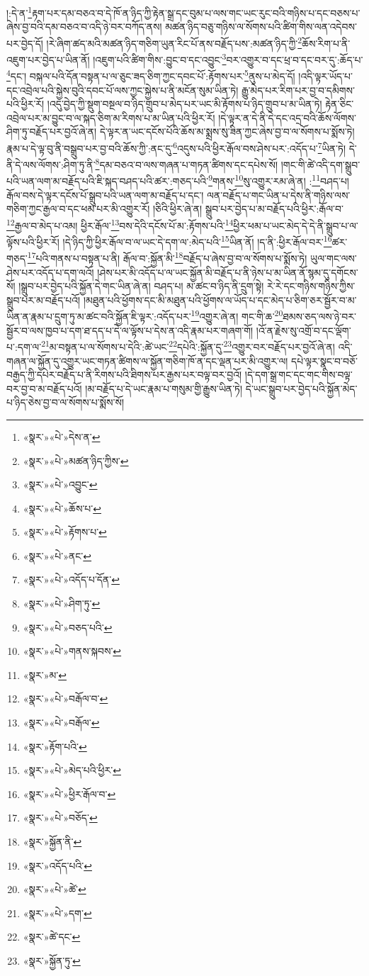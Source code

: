 །:དེ་ན་\footnote{«སྣར་»«པེ་»དེས་ན་}རྟག་པར་དམ་བཅའ་བ་དེ་ཁོ་ན་ཉིད་ཀྱི་རྟེན་སྒྲ་དང་བུམ་པ་ལས་གང་ཡང་རུང་བའི་གཉིས་པ་དང་བཅས་པ་ཞེས་བྱ་བའི་དམ་བཅའ་བ་འདི་ཉེ་བར་བཀོད་ནས། མཚན་ཉིད་བཅུ་གཉིས་ལ་སོགས་པའི་ཚིག་གིས་ལན་འདེབས་པར་བྱེད་དོ། །རེ་ཞིག་ཚད་མའི་མཚན་ཉིད་གཅིག་ཡུན་རིང་པོ་ནས་བརྗོད་པས་:མཚན་ཉིད་ཀྱི་\footnote{«སྣར་»«པེ་»མཚན་ཉིད་ཀྱིས་}ཆོས་རིག་པ་ནི་འཇུག་པར་བྱེད་པ་ཡིན་ནོ། །འཇུག་པའི་ཚིག་གིས་:བྱུང་བ་དང་འབྱུང་\footnote{«སྣར་»«པེ་»འབྱུང་}བར་འགྱུར་བ་དང་ཕྲ་བ་དང་བར་དུ་:ཆོད་པ་\footnote{«སྣར་»«པེ་»ཆོས་པ་}དང་། བསྐལ་པའི་དོན་བསྟན་པ་ལ་ཅུང་ཟད་ཅིག་ཀྱང་དབང་པོ་:རྟོགས་པར་\footnote{«སྣར་»«པེ་»རྟོགས་པ་}ནུས་པ་མེད་དོ། །འདི་ལྟར་ཡོད་པ་དང་འབྲེལ་པའི་སྐྱེས་བུའི་དབང་པོ་ལས་ཀྱང་སྐྱེས་པ་ནི་མངོན་སུམ་ཡིན་ཏེ། རྒྱུ་མེད་པར་རིག་པར་བྱ་བ་དམིགས་པའི་ཕྱིར་རོ། །འདུ་བྱེད་ཀྱི་སྡུག་བསྔལ་བ་ཉིད་གྲུབ་པ་མེད་པར་ཡང་མི་རྟོགས་པ་ཉིད་གྲུབ་པ་མ་ཡིན་ཏེ། རྟེན་ཅིང་འབྲེལ་པར་མ་བྱུང་བ་ལ་སྐད་ཅིག་མ་རིགས་པ་མ་ཡིན་པའི་ཕྱིར་རོ། །དེ་ལྟར་ན་དེ་ནི་དེ་དང་འདྲ་བའི་ཆོས་ལོགས་ཤིག་ཏུ་བརྗོད་པར་བྱའོ་ཞེ་ན། དེ་ལྟར་ན་ཡང་དངོས་པོའི་ཆོས་མ་སྨྲས་སུ་ཟིན་ཀྱང་ཞེས་བྱ་བ་ལ་སོགས་པ་སྨོས་ཏེ། རྣམ་པ་དེ་ལྟ་བུ་ནི་བསྒྲུབ་པར་བྱ་བའི་ཆོས་ཀྱི་:ནང་དུ་\footnote{«སྣར་»«པེ་»ནང་}འདུས་པའི་ཕྱིར་རྒོལ་བས་ཤེས་པར་:འདོད་པ་\footnote{«སྣར་»«པེ་»འདོད་པ་དོན་}ཡིན་ཏེ། དེ་ནི་དེ་ལས་ལོགས་:ཤིག་ཏུ་ནི་\footnote{«སྣར་»«པེ་»ཤིག་ཏུ་}དམ་བཅའ་བ་ལས་གཞན་པ་གཏན་ཚིགས་དང་དཔེས་སོ། །གང་གི་ཚེ་འདི་དག་སྒྲུབ་པའི་ཡན་ལག་མ་བརྗོད་པའི་ཇི་སྐད་བཤད་པའི་ཚར་:གཅད་པའི་\footnote{«སྣར་»«པེ་»བཅད་པའི་}གནས་\footnote{«སྣར་»«པེ་»གནས་སྐབས་}སུ་འགྱུར་རམ་ཞེ་ན། :\footnote{«སྣར་»མ་}བཤད་པ། རྒོལ་བས་དེ་ལྟར་དངོས་པོ་སྒྲུབ་པའི་ཡན་ལག་མ་བརྗོད་པ་དང་། ལན་བརྗོད་པ་གང་ཡིན་པ་དེས་ནི་གཉིས་ལས་གཅིག་ཀྱང་རྒྱལ་བ་དང་ཕམ་པར་མི་འགྱུར་རོ། །ཅིའི་ཕྱིར་ཞེ་ན། སྒྲུབ་པར་བྱེད་པ་མ་བརྗོད་པའི་ཕྱིར་:རྒོལ་བ་\footnote{«སྣར་»«པེ་»བརྒོལ་བ་}རྒྱལ་བ་མེད་པ་འམ། ཕྱིར་རྒོལ་\footnote{«སྣར་»«པེ་»བརྒོལ་}བས་དེའི་དངོས་པོ་མ་:རྟོགས་པའི་\footnote{«སྣར་»རྟོག་པའི་}ཕྱིར་ཕམ་པ་ཡང་མེད་དེ་དེ་ནི་སྒྲུབ་པ་ལ་ལྟོས་པའི་ཕྱིར་རོ། །དེ་ཉིད་ཀྱི་ཕྱིར་རྒོལ་བ་ལ་ཡང་དེ་དག་ལ་:མེད་པའི་\footnote{«སྣར་»«པེ་»མེད་པའི་ཕྱིར་}ཡིན་ནོ། །ད་ནི་:ཕྱིར་རྒོལ་བར་\footnote{«སྣར་»«པེ་»ཕྱིར་རྒོལ་བ་}ཚར་གཅད་\footnote{«སྣར་»«པེ་»བཅོད་}པའི་གནས་པ་བསྟན་པ་ནི། རྒོལ་བ་:སྐྱོན་མི་\footnote{«སྣར་»སྐྱོན་ནི་}བརྗོད་པ་ཞེས་བྱ་བ་ལ་སོགས་པ་སྨོས་ཏེ། ཡུལ་གང་ལས་ཤེས་པར་འདོད་པ་དག་ལའོ། །ཤེས་པར་མི་འདོད་པ་ལ་ཡང་སྐྱོན་མི་བརྗོད་པ་ནི་ཉེས་པ་མ་ཡིན་ནོ་སྙམ་དུ་དགོངས་སོ། །སྒྲུབ་པར་བྱེད་པའི་སྐྱོན་དེ་གང་ཡིན་ཞེ་ན། བཤད་པ། མ་ཚང་བ་ཉིད་ནི་དྲུག་སྟེ། རེ་རེ་དང་གཉིས་གཉིས་ཀྱིས་སྒྲུབ་པར་མ་བརྗོད་པའོ། །མཐུན་པའི་ཕྱོགས་དང་མི་མཐུན་པའི་ཕྱོགས་ལ་ཡོད་པ་དང་མེད་པ་ཅིག་ཅར་སྦྱོར་བ་མ་ཡིན་ན་རྣམ་པ་དྲུག་ཏུ་མ་ཚང་བའི་སྐྱོན་ཇི་ལྟར་:འདོད་པར་\footnote{«སྣར་»འདོད་པའི་}འགྱུར་ཞེ་ན། གང་གི་ཆ་\footnote{«སྣར་»«པེ་»ཚེ་}ཐམས་ཅད་ལས་ཉེ་བར་སྦྱོར་བ་ལས་ཁྱབ་པ་དག་ཐ་དད་པ་དེ་ལ་ལྟོས་པ་དེས་ན་འདི་རྣམ་པར་གཞག་གོ། །འོ་ན་རྗེས་སུ་འགྲོ་བ་དང་ལྡོག་པ་:དག་ལ་\footnote{«སྣར་»«པེ་»དག་}མ་བསྟན་པ་ལ་སོགས་པ་དེའི་:ཚེ་ཡང་\footnote{«སྣར་»ཚེ་དང་}དཔེའི་:སྐྱོན་དུ་\footnote{«སྣར་»སྐྱོན་ཏུ་}འགྱུར་བར་བརྗོད་པར་བྱའོ་ཞེ་ན། འདི་གཞན་ལ་སྐྱོན་དུ་འགྱུར་ཡང་གཏན་ཚིགས་ལ་སྐྱོན་གཅིག་ཁོ་ན་དང་ལྡན་པར་མི་འགྱུར་ལ། དཔེ་ལྟར་སྣང་བ་བཅོ་བརྒྱད་ཀྱི་དཔེར་བརྗོད་པ་ནི་རིགས་པའི་ཐིགས་པར་རྒྱས་པར་བལྟ་བར་བྱའོ། །དེ་དག་སྒྲ་གང་དང་གང་གིས་བལྟ་བར་བྱ་བ་མ་བརྗོད་པའོ། །མ་བརྗོད་པ་དེ་ཡང་རྣམ་པ་གསུམ་གྱི་རྒྱུས་ཡིན་ཏེ། དེ་ཡང་སྒྲུབ་པར་བྱེད་པའི་སྐྱོན་མེད་པ་ཉིད་ཅེས་བྱ་བ་ལ་སོགས་པ་སྨོས་སོ། 